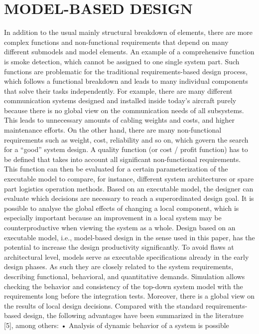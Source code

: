 \section*{MODEL-BASED DESIGN}

In addition to the usual mainly structural breakdown of
elements, there are more complex functions and non-functional
requirements that depend on many different submodels and
model elements. An example of a comprehensive function
is smoke detection, which cannot be assigned to one single
system part. Such functions are problematic for the traditional
requirements-based design process, which follows a functional
breakdown and leads to many individual components that
solve their tasks independently. For example, there are many
different communication systems designed and installed inside
today’s aircraft purely because there is no global view on
the communication needs of all subsystems. This leads to
unnecessary amounts of cabling weights and costs, and higher
maintenance efforts.
On the other hand, there are many non-functional requirements such as weight, cost, reliability and so on, which
govern the search for a “good” system design. A quality
function (or cost / profit function) has to be defined that takes
into account all significant non-functional requirements. This
function can then be evaluated for a certain parameterization of
the executable model to compare, for instance, different system
architectures or spare part logistics operation methods.
Based on an executable model, the designer can evaluate
which decisions are necessary to reach a superordinated design
goal. It is possible to analyse the global effects of changing
a local component, which is especially important because an
improvement in a local system may be counterproductive when
viewing the system as a whole.
Design based on an executable model, i.e., model-based
design in the sense used in this paper, has the potential to
increase the design productivity significantly. To avoid flaws
at architectural level, models serve as executable specifications already in the early design phases. As such they are
closely related to the system requirements, describing functional, behavioral, and quantitative demands. Simulation allows
checking the behavior and consistency of the top-down system
model with the requirements long before the integration tests.
Moreover, there is a global view on the results of local design
decisions.
Compared with the standard requirements-based design, the
following advantages have been summarized in the literature [5], among others:
• Analysis of dynamic behavior of a system is possible
